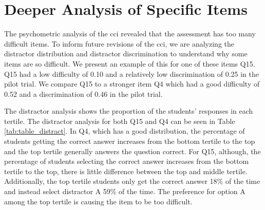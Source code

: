 %

\fi



\FloatBarrier
\section{Deeper Analysis of Specific Items}

The psychometric analysis of the \gls{cci} revealed that the assessment has too many difficult items. To inform future revisions of the \gls{cci}, we are analyzing the distractor distribution and distractor discrimination to understand why some items are so difficult. We present an example of this for one of these items Q15. Q15 had a low difficulty of 0.10 and a relatively low discrimination of 0.25 in the pilot trial. We compare Q15 to a stronger item Q4 which had a good difficulty of 0.52 and a discrimination of 0.46 in the pilot trial. 

The distractor analysis shows the proportion of the students' responses in each tertile. The distractor analysis for both Q15 and Q4 can be seen in Table \ref{tab:table_distract}. In Q4, which has a good distribution, the percentage of students getting the correct answer increases from the bottom tertile to the top and the top tertile generally answers the question correct. For Q15, although, the percentage of students selecting the correct answer increases from the bottom tertile to the top, there is little difference between the top and middle tertile. Additionally, the top tertile students only get the correct answer 18\% of the time and instead select distractor A 59\% of the time. The preference for option A among the top tertile is causing the item to be too difficult.

